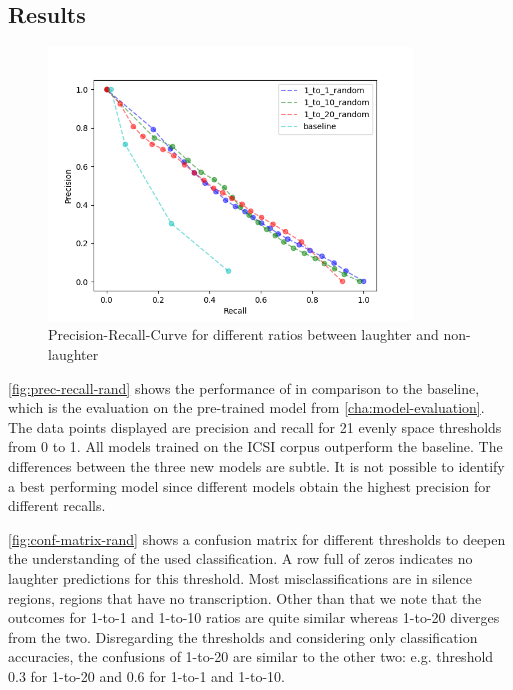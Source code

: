 \documentclass[bsc,frontabs,parskip,deptreport]{infthesis}
\begin{document}
\subsection{Results} \label{sec:exp1-res}

\begin{figure}[h!]
    \centering
    \includegraphics[width = 3.8in]{imgs/prec-recall/random/dev_compare_class_balance_dev_set.png}
    \caption{Precision-Recall-Curve for different ratios between laughter and non-laughter}
    \label{fig:prec-recall-rand}
\end{figure}

\autoref{fig:prec-recall-rand} shows the performance of in comparison to the baseline, which is the evaluation on the pre-trained model from \autoref{cha:model-evaluation}. The data points displayed are precision and recall for 21 evenly space thresholds from 0 to 1. All models trained on the ICSI corpus outperform the baseline. The differences between the three new models are subtle. It is not possible to identify a best performing model since different models obtain the highest precision for different recalls.

\autoref{fig:conf-matrix-rand} shows a confusion matrix for different thresholds to deepen the understanding of the used classification. 
A row full of zeros indicates no laughter predictions for this threshold.
Most misclassifications are in silence regions, regions that have no transcription. Other than that we note that the outcomes for 1-to-1 and 1-to-10 ratios are quite similar whereas 1-to-20 diverges from the two. Disregarding the thresholds and considering only classification accuracies, the confusions of 1-to-20 are similar to the other two: e.g. threshold 0.3 for 1-to-20 and 0.6 for 1-to-1 and 1-to-10.
\end{document}
